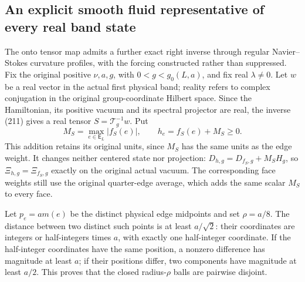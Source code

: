 \documentclass[11pt]{article}
\begin{document}
\subsection{An explicit smooth fluid representative of every real band state}

The onto tensor map admits a further exact right inverse through
regular Navier--Stokes curvature profiles, with the forcing constructed
rather than suppressed. Fix the original positive $\nu,a,g$, with
$0<g<g_0(L,a)$, and fix real $\lambda\ne0$. Let $w$ be a real
vector in the actual first physical band; reality refers to complex
conjugation in the original group-coordinate Hilbert space. Since
the Hamiltonian, its positive vacuum and its spectral projector are
real, the inverse (211) gives a real tensor
$S=\mathcal T_g^{-1}w$. Put
\begin{equation}\label{eq:band-positive-edge-profile}
 M_S=\max_{e\in\mathsf E_L}|f_S(e)|,\qquad h_e=f_S(e)+M_S\ge0.
\end{equation}
This addition retains its original units, since $M_S$ has the same
units as the edge weight. It changes neither centered state nor
projection: $D_{h,g}=D_{f_S,g}+M_SH_g$, so
$\Xi_{h,g}=\Xi_{f_S,g}$ exactly on the original actual vacuum.
The corresponding face weights still use the original quarter-edge
average, which adds the same scalar $M_S$ to every face.

Let $p_e=a m(e)$ be the distinct physical edge midpoints and set
$\rho=a/8$. The distance between two distinct such points is at
least $a/\sqrt2$: their coordinates are integers or half-integers
times $a$, with exactly one half-integer coordinate. If the
half-integer coordinates have the same position, a nonzero
difference has magnitude at least $a$; if their positions differ,
two components have magnitude at least $a/2$. This proves that
the closed radius-$\rho$ balls are pairwise disjoint.
\end{document}
